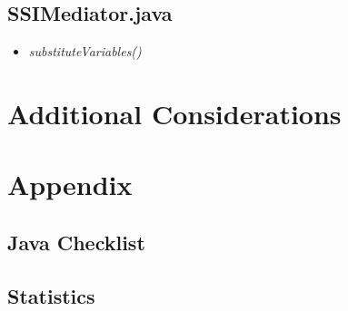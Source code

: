 \documentclass[11pt,titlepage]{article} %
\begin{document}
\subsection{SSIMediator.java}
  \begin{itemize}
   \item \textit{substituteVariables()}
  \end{itemize}

\section{Additional Considerations}

\section{Appendix}
\subsection{Java Checklist}
\subsection{Statistics}
\end{document}
